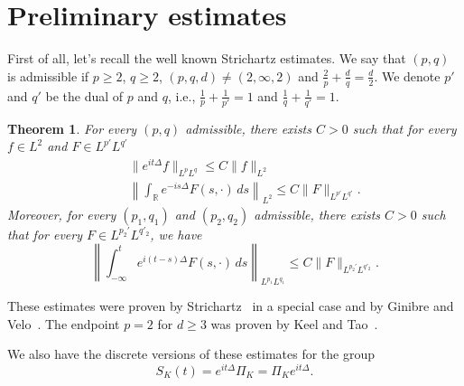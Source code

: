 \documentclass[10pt,a4paper]{article}
\newtheorem{theorem}{Theorem}[section]
\begin{document}
  \section{Preliminary estimates}\label{sec:pre-estim}

  First of all, let's recall the well known Strichartz estimates. We say that 
  \( (p,q) \) is admissible if \(p \geq 2\), \(q \geq 2\), \((p,q,d) \neq (2,\infty,2)\)
  and \( \frac2p + \frac{d}q = \frac{d}2 \). We denote \(p'\)
  and \(q'\) be the dual of \(p\) and \(q\), i.e., \(\frac1p+\frac1{p'} = 1\) 
  and \(\frac1q+\frac1{q'} = 1\). 

  \begin{theorem}
    For every \((p,q)\) admissible, there exists \(C > 0\) such that for every 
    \( f \in L^2 \) and \( F \in L^{p'} L^{q'} \)
    \begin{eqnarray}
      \label{Tc} & & \|e^{it \Delta} f \|_{L^p{L^q}} \leq C \| f\|_{L^2} \\
      \label{T*c} & & \left \| \int_{\mathbb R} e^{-is \Delta } F(s,\cdot)\, ds\right\|_{L^2} 
      \leq C \|F \|_{L^{p'} L^{q'}}.
    \end{eqnarray}
    Moreover, for every \((p_1, q_1)\) and \((p_2, q_2)\) admissible, there exists
    \(C > 0\) such that for every \(F \in L^{p_2'} L^{q'_2}\), we have
    \begin{equation}\label{TT*c} 
      \left\| \int_{-\infty}^t e^{i ( t-s ) \Delta } F(s,\cdot) \, ds \right\|_{L^{p_{1}} L^{q_{1}}}
      \leq  C \|F \|_{L^{p_{2}'} L^{q'_{2}}}.
    \end{equation}
  \end{theorem}

  These estimates were proven by Strichartz~\cite{Sz77} in a special case and by
  Ginibre and Velo~\cite{GiVl85}. The endpoint \(p=2\) for \(d \geq 3\) was proven by
  Keel and Tao~\cite{KeTa98}.

  We also have the discrete versions of these estimates for the group 
  \begin{equation}\label{SK}
    S_K(t) = e^{it\Delta} \Pi_K = \Pi_K e^{it\Delta}.
  \end{equation}
\end{document}
